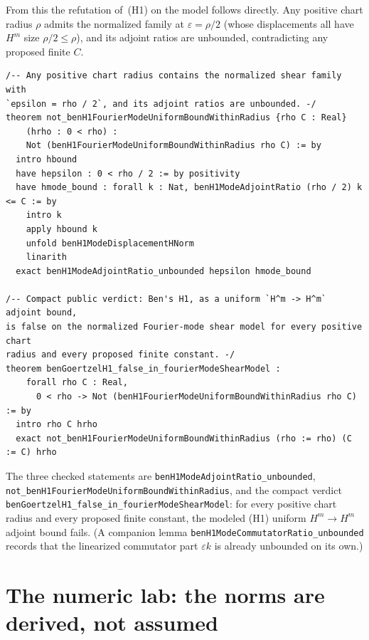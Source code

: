 \documentclass[11pt]{article}
\theoremstyle{definition}
\newcommand{\Hm}{H^m}
\begin{document}
From this the refutation of~(H1) on the model follows directly. Any positive
chart radius $\rho$ admits the normalized family at $\varepsilon=\rho/2$ (whose
displacements all have $\Hm$ size $\rho/2\le\rho$), and its adjoint ratios are
unbounded, contradicting any proposed finite $C$.

\begin{lstlisting}[language={}]
/-- Any positive chart radius contains the normalized shear family with
`epsilon = rho / 2`, and its adjoint ratios are unbounded. -/
theorem not_benH1FourierModeUniformBoundWithinRadius {rho C : Real}
    (hrho : 0 < rho) :
    Not (benH1FourierModeUniformBoundWithinRadius rho C) := by
  intro hbound
  have hepsilon : 0 < rho / 2 := by positivity
  have hmode_bound : forall k : Nat, benH1ModeAdjointRatio (rho / 2) k <= C := by
    intro k
    apply hbound k
    unfold benH1ModeDisplacementHNorm
    linarith
  exact benH1ModeAdjointRatio_unbounded hepsilon hmode_bound

/-- Compact public verdict: Ben's H1, as a uniform `H^m -> H^m` adjoint bound,
is false on the normalized Fourier-mode shear model for every positive chart
radius and every proposed finite constant. -/
theorem benGoertzelH1_false_in_fourierModeShearModel :
    forall rho C : Real,
      0 < rho -> Not (benH1FourierModeUniformBoundWithinRadius rho C) := by
  intro rho C hrho
  exact not_benH1FourierModeUniformBoundWithinRadius (rho := rho) (C := C) hrho
\end{lstlisting}

The three checked statements are
\texttt{benH1ModeAdjointRatio\_unbounded},
\texttt{not\_benH1FourierModeUniformBoundWithinRadius}, and the compact verdict
\texttt{benGoertzelH1\_false\_in\_fourierModeShearModel}: for every positive
chart radius and every proposed finite constant, the modeled (H1) uniform
$\Hm\to\Hm$ adjoint bound fails. (A companion lemma
\texttt{benH1ModeCommutatorRatio\_unbounded} records that the linearized
commutator part $\varepsilon k$ is already unbounded on its own.)

\section{The numeric lab: the norms are derived, not assumed}
\label{sec:lab}
\end{document}
